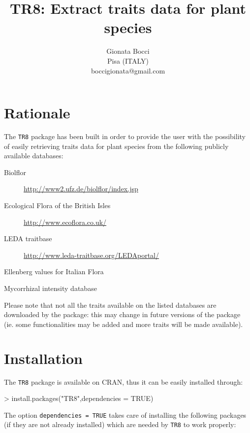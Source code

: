 \documentclass{article}
\title{TR8: Extract traits data for plant species}
\author{Gionata Bocci\\Pisa (ITALY)\\ {boccigionata@gmail.com}}
\begin{document}
\maketitle



\section{Rationale}
\label{sec:rationale}




The \texttt{TR8} package has been built in order to provide the user with the
possibility of easily retrieving traits data for plant species from the following publicly available databases:

\begin{description}
\item[Biolflor] \url{http://www2.ufz.de/biolflor/index.jsp} \cite{biolflor}
\item[Ecological Flora of the British Isles] \url{http://www.ecoflora.co.uk/} \cite{ecoflora}
\item[LEDA traitbase] \url{http://www.leda-traitbase.org/LEDAportal/} \cite{leda}
\item[Ellenberg values for Italian Flora] \cite{pignatti}
\item[Mycorrhizal intensity database] \cite{amf}
\end{description}

  Please note that not all the traits available on the listed
  databases are downloaded by the package: this may change in future
  versions of the package (ie. some functionalities may be added and
  more traits will be made available).

\section{Installation}
\label{sec:installation}
  
  The \texttt{TR8} package is available on CRAN, thus it can be easily installed through:
  
\begin{Schunk}
\begin{Sinput}
> install.packages("TR8",dependencies = TRUE)
\end{Sinput}
\end{Schunk}

The option \texttt{dependencies = TRUE} takes care of installing the
following packages (if they are not already installed) which are
needed by \texttt{TR8} to work properly: 
\end{document}
